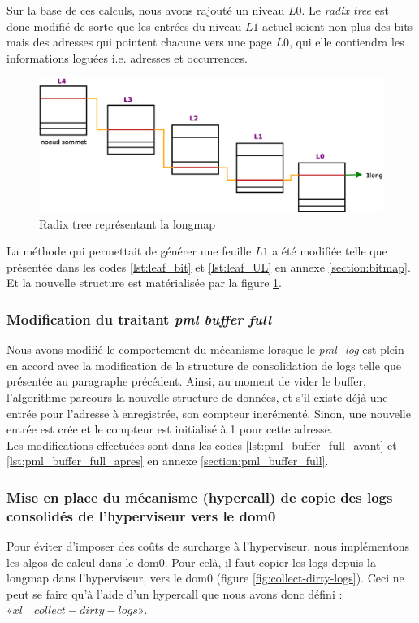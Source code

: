 \noindent Sur la base de ces calculs, nous avons rajouté un niveau $L0$. Le \textit{radix tree} est donc modifié de sorte que les entrées du niveau $L1$ actuel soient non plus des bits mais des adresses qui pointent chacune vers une page $L0$, qui elle contiendra les informations loguées i.e. adresses et occurrences.\\

\begin{figure}[H]
    \centering
    \includegraphics[scale=.6,width=1\linewidth]{chapters/4/fig4/longmap}
    \caption{Radix tree représentant la longmap}
    \label{fig:longmap}
\end{figure}

\noindent La méthode qui permettait de générer une feuille $L1$ a été modifiée telle que présentée dans les codes \ref{lst:leaf_bit} et \ref{lst:leaf_UL} en annexe \ref{section:bitmap}. Et la nouvelle structure est matérialisée par la figure \ref{fig:longmap}.

\subsubsection{Modification du traitant \textit{pml buffer full}}
Nous avons modifié le comportement du mécanisme lorsque le \textit{pml\_log} est plein en accord avec la modification de la structure de consolidation de logs telle que présentée au paragraphe précédent. Ainsi, au moment de vider le buffer, l'algorithme parcours la nouvelle structure de données, et s'il existe déjà une entrée pour l'adresse à enregistrée, son compteur incrémenté. Sinon, une nouvelle entrée est crée et le compteur est initialisé à 1 pour cette adresse.\\
Les modifications effectuées sont dans les codes \ref{lst:pml_buffer_full_avant} et \ref{lst:pml_buffer_full_apres} en annexe \ref{section:pml_buffer_full}.

\subsubsection{Mise en place du mécanisme (hypercall) de copie des logs consolidés de l'hyperviseur vers le dom0}
Pour éviter d'imposer des coûts de surcharge à l'hyperviseur, nous implémentons les algos de calcul dans le dom0. Pour celà, il faut copier les logs depuis la longmap dans l'hyperviseur, vers le dom0 (figure \ref{fig:collect-dirty-logs}). Ceci ne peut se faire qu'à l'aide d'un hypercall que nous avons donc défini : $«xl \quad collect-dirty-logs»$.

